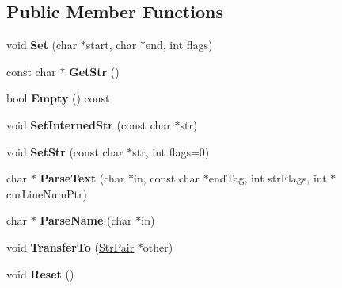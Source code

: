 \subsection*{Public Member Functions}
\begin{DoxyCompactItemize}
\item 
\mbox{\label{classtinyxml2_1_1StrPair_a4f05549373394266a1eecba26813c166}} 
void {\bfseries Set} (char $\ast$start, char $\ast$end, int flags)
\item 
\mbox{\label{classtinyxml2_1_1StrPair_a27290a8fec20c0a6ccf9d8362f5c3b1d}} 
const char $\ast$ {\bfseries Get\+Str} ()
\item 
\mbox{\label{classtinyxml2_1_1StrPair_aca963a7eaa900bfddbea7312f040b39c}} 
bool {\bfseries Empty} () const
\item 
\mbox{\label{classtinyxml2_1_1StrPair_a2baf6230e18333e02ab65d0897ee3941}} 
void {\bfseries Set\+Interned\+Str} (const char $\ast$str)
\item 
\mbox{\label{classtinyxml2_1_1StrPair_a1f82ec6b5bee35ee7466d8565e43b1de}} 
void {\bfseries Set\+Str} (const char $\ast$str, int flags=0)
\item 
\mbox{\label{classtinyxml2_1_1StrPair_a17fcee610027ae142297f3317d619c04}} 
char $\ast$ {\bfseries Parse\+Text} (char $\ast$in, const char $\ast$end\+Tag, int str\+Flags, int $\ast$cur\+Line\+Num\+Ptr)
\item 
\mbox{\label{classtinyxml2_1_1StrPair_a8452c0c7f140d4d613134e952ce54f14}} 
char $\ast$ {\bfseries Parse\+Name} (char $\ast$in)
\item 
\mbox{\label{classtinyxml2_1_1StrPair_a35f795b1557fe5fdcbd93d3cc5d6b939}} 
void {\bfseries Transfer\+To} (\mbox{\hyperlink{classtinyxml2_1_1StrPair}{Str\+Pair}} $\ast$other)
\item 
\mbox{\label{classtinyxml2_1_1StrPair_a80c1b3bd99bf62ae85c94a29ce537125}} 
void {\bfseries Reset} ()
\end{DoxyCompactItemize}

